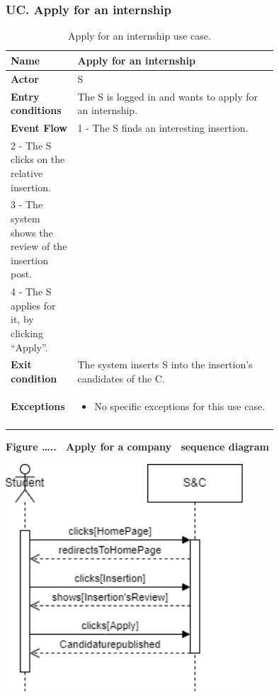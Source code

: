 \subsubsection*{UC\cuc . Apply for an internship}
\begin{center}
    \begin{longtable}{|l|p{0.75\linewidth}|}
        \hline
        \textbf{Name}               & Apply for an internship\\
        \hline
        \textbf{Actor}              & S\\
        \hline
        \textbf{Entry conditions}   & The S is logged in and wants to apply for an internship.\\
        \hline
        \textbf{Event Flow}         & 
        1 - The S finds an interesting insertion. \\
        2 - The S clicks on the relative insertion. \\
        3 - The system shows the review of the insertion post. \\
        4 - The S applies for it, by clicking “Apply”. \\
        \hline
        \textbf{Exit condition}   & The system inserts S into the insertion’s candidates of the C. \\       
        \hline
        \textbf{Exceptions}       & \begin{itemize}
            \item No specific exceptions for this use case.
        \end{itemize}\\
        \hline
        \caption{Apply for an internship use case.}
        \label{tab: apply_for_an_internship_use_case}
    \end{longtable}
\end{center}


\textbf{Figure \ldots..~ Apply for a company~ sequence diagram}

\includegraphics[width=3.5in,height=3.34722in]{Images/image6.png}


